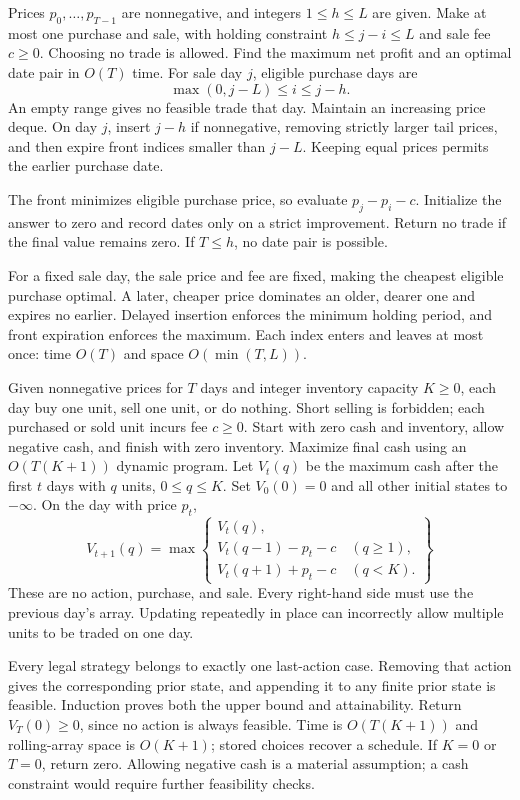 Prices $p_0,\ldots,p_{T-1}$ are nonnegative, and integers $1\le h\le L$ are given. Make at most one purchase and sale, with holding constraint $h\le j-i\le L$ and sale fee $c\ge0$. Choosing no trade is allowed. Find the maximum net profit and an optimal date pair in $O(T)$ time.
\solution For sale day $j$, eligible purchase days are
\[
\max(0,j-L)\le i\le j-h.
\]
An empty range gives no feasible trade that day. Maintain an increasing price deque. On day $j$, insert $j-h$ if nonnegative, removing strictly larger tail prices, and then expire front indices smaller than $j-L$. Keeping equal prices permits the earlier purchase date.

The front minimizes eligible purchase price, so evaluate $p_j-p_i-c$. Initialize the answer to zero and record dates only on a strict improvement. Return no trade if the final value remains zero. If $T\le h$, no date pair is possible.

For a fixed sale day, the sale price and fee are fixed, making the cheapest eligible purchase optimal. A later, cheaper price dominates an older, dearer one and expires no earlier. Delayed insertion enforces the minimum holding period, and front expiration enforces the maximum. Each index enters and leaves at most once: time $O(T)$ and space $O(\min(T,L))$.

Given nonnegative prices for $T$ days and integer inventory capacity $K\ge0$, each day buy one unit, sell one unit, or do nothing. Short selling is forbidden; each purchased or sold unit incurs fee $c\ge0$. Start with zero cash and inventory, allow negative cash, and finish with zero inventory. Maximize final cash using an $O(T(K+1))$ dynamic program.
\solution Let $V_t(q)$ be the maximum cash after the first $t$ days with $q$ units, $0\le q\le K$. Set $V_0(0)=0$ and all other initial states to $-\infty$. On the day with price $p_t$,
\[
V_{t+1}(q)=\max\left\{
\begin{array}{l}
V_t(q),\\
V_t(q-1)-p_t-c\quad(q\ge1),\\
V_t(q+1)+p_t-c\quad(q<K).
\end{array}\right\}
\]
These are no action, purchase, and sale. Every right-hand side must use the previous day's array. Updating repeatedly in place can incorrectly allow multiple units to be traded on one day.

Every legal strategy belongs to exactly one last-action case. Removing that action gives the corresponding prior state, and appending it to any finite prior state is feasible. Induction proves both the upper bound and attainability. Return $V_T(0)\ge0$, since no action is always feasible. Time is $O(T(K+1))$ and rolling-array space is $O(K+1)$; stored choices recover a schedule. If $K=0$ or $T=0$, return zero. Allowing negative cash is a material assumption; a cash constraint would require further feasibility checks.

